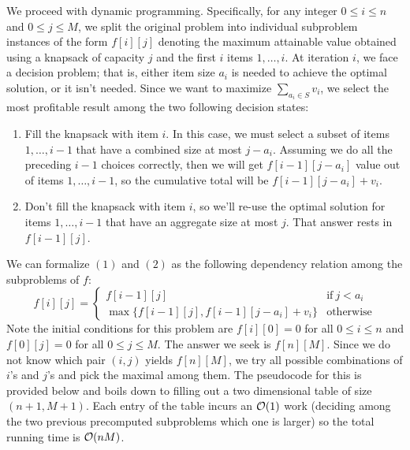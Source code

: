 \documentclass{article}
\begin{document}
\begin{enumerate}[leftmargin={*}, font={\bf}, label={\arabic*.}, ref={\arabic*}]
\begin{enumerate}
        We proceed with dynamic programming. Specifically, for any integer $0 \leq i \leq n$ and $0
        \leq j \leq M$, we split the original problem into individual subproblem instances of the
        form $f[i][j]$ denoting the maximum attainable value obtained using a knapsack of capacity
        $j$ and the first $i$ items $1, \ldots, i$. At iteration $i$, we face a decision problem;
        that is, either item size $a_i$ is needed to achieve the optimal solution, or it isn't needed.
        Since we want to maximize $\sum_{a_i \in S} v_i$, we select the most profitable result among
        the two following decision states:

        \begin{enumerate}[label={(\arabic*)}, itemsep={0pt}]
          \item
            Fill the knapsack with item $i$. In this case, we must select a subset of items $1, \ldots,
            i-1$ that have a combined size at most $j - a_i$. Assuming we do all the preceding $i-1$
            choices correctly, then we will get $f[i-1][j-a_i]$ value out of items $1, \ldots, i-1$,
            so the cumulative total will be $f[i-1][j-a_i] + v_i$.
          \item
            Don't fill the knapsack with item $i$, so we'll re-use the optimal solution for items $1,
            \ldots, i-1$ that have an aggregate size at most $j$. That answer rests in $f[i-1][j]$.
        \end{enumerate}

        We can formalize $(1)$ and $(2)$ as the following dependency relation among the subproblems
        of $f$:
        \[
          f[i][j] =
            \begin{cases}
              f[i-1][j] & \text{if}\ j < a_i \\
              \max\big\{f[i-1][j], f[i-1][j-a_i] + v_i\big\} & \text{otherwise}
            \end{cases}
        \]
        Note the initial conditions for this problem are $f[i][0] = 0$ for all $0 \leq i \leq n$ 
        and $f[0][j] = 0$ for all $0 \leq j \leq M$. The answer we seek is $f[n][M]$. Since we do
        not know which pair $(i,j)$ yields $f[n][M]$, we try all possible combinations of $i$'s and
        $j$'s and pick the maximal among them. The pseudocode for this is provided below and boils
        down to filling out a two dimensional table of size $(n+1, M+1)$. Each entry of the table
        incurs an $\operatorname*{\mathcal{O}}(1)$ work (deciding among the two previous precomputed subproblems which one
        is larger) so the total running time is $\operatorname*{\mathcal{O}}(nM)$.


\end{enumerate}
\end{enumerate}
\end{document}

